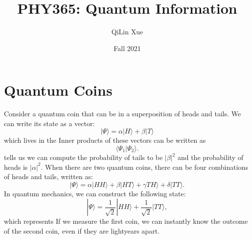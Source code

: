 \documentclass{article}
\title{PHY365: Quantum Information}
\author{QiLin Xue}
\date{Fall 2021}
\numberwithin{equation}{section}
\begin{document}
\maketitle
\tableofcontents
\newpage
\section{Quantum Coins}
Consider a quantum coin that can be in a superposition of heads and tails. We can write its state as a vector:
\begin{equation}
    |\Psi\rangle = \alpha|H\rangle + \beta|T\rangle  
\end{equation}
which lives in the  Inner products of these vectors can be written as 
\begin{equation}
    \langle \Psi_1 | \Psi_2 \rangle.
\end{equation}
 tells us we can compute the probability of tails to be $|\beta|^2$ and the probability of heads is $|\alpha|^2$. When there are two quantum coins, there can be four combinations of heads and tails, written as:
\begin{equation}
    |\Psi\rangle = \alpha|HH\rangle + \beta|HT\rangle + \gamma TH\rangle + \delta |TT\rangle.
\end{equation}
In quantum mechanics, we can construct the following state:
\begin{equation}
    |\Psi\rangle = \frac{1}{\sqrt{2}}|HH\rangle + \frac{1}{\sqrt{2}}|TT\rangle,
\end{equation}
which represents  If we measure the first coin, we can instantly know the outcome of the second coin, even if they are lightyears apart.
\end{document}
